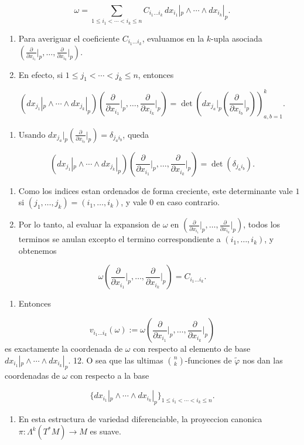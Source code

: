 \begin{bookproof}{}
\[
\omega=\sum_{1\le i_1<\cdots<i_k\le n}C_{i_1\ldots i_k}\,dx_{i_1}|_p\wedge\cdots\wedge dx_{i_k}|_p.
\]
\begin{enumerate}[start=6]
\item Para averiguar el coeficiente $C_{i_1\ldots i_k}$, evaluamos en la $k$-upla asociada $\left(\frac{\partial}{\partial x_{i_1}}\big|_p,\ldots,\frac{\partial}{\partial x_{i_k}}\big|_p\right)$.
\item En efecto, si $1\le j_1<\cdots<j_k\le n$, entonces
\end{enumerate}
\[
(dx_{j_1}|_p\wedge\cdots\wedge dx_{j_k}|_p)\left(\frac{\partial}{\partial x_{i_1}}\bigg|_p,\ldots,\frac{\partial}{\partial x_{i_k}}\bigg|_p\right)=\det\left(dx_{j_a}|_p\left(\frac{\partial}{\partial x_{i_b}}\bigg|_p\right)\right)_{a,b=1}^k.
\]
\begin{enumerate}[start=8]
\item Usando $dx_{j_a}|_p\left(\frac{\partial}{\partial x_{i_b}}\big|_p\right)=\delta_{j_a i_b}$, queda
\end{enumerate}
\[
(dx_{j_1}|_p\wedge\cdots\wedge dx_{j_k}|_p)\left(\frac{\partial}{\partial x_{i_1}}\bigg|_p,\ldots,\frac{\partial}{\partial x_{i_k}}\bigg|_p\right)=\det(\delta_{j_a i_b}).
\]
\begin{enumerate}[start=9]
\item Como los indices estan ordenados de forma creciente, este determinante vale $1$ si $(j_1,\ldots,j_k)=(i_1,\ldots,i_k)$, y vale $0$ en caso contrario.
\item Por lo tanto, al evaluar la expansion de $\omega$ en $\left(\frac{\partial}{\partial x_{i_1}}\big|_p,\ldots,\frac{\partial}{\partial x_{i_k}}\big|_p\right)$, todos los terminos se anulan excepto el termino correspondiente a $(i_1,\ldots,i_k)$, y obtenemos
\end{enumerate}
\[
\omega\left(\frac{\partial}{\partial x_{i_1}}\bigg|_p,\ldots,\frac{\partial}{\partial x_{i_k}}\bigg|_p\right)=C_{i_1\ldots i_k}.
\]
\begin{enumerate}[start=11]
\item Entonces
\end{enumerate}
\[
v_{i_1\ldots i_k}(\omega):=\omega\left(\frac{\partial}{\partial x_{i_1}}\bigg|_p,\ldots,\frac{\partial}{\partial x_{i_k}}\bigg|_p\right)
\]
es exactamente la coordenada de $\omega$ con respecto al elemento de base $dx_{i_1}|_p\wedge\cdots\wedge dx_{i_k}|_p$. 12. O sea que las ultimas $\binom nk$-funciones de $\widetilde\varphi$ nos dan las coordenadas de $\omega$ con respecto a la base

\[
\{dx_{i_1}|_p\wedge\cdots\wedge dx_{i_k}|_p\}_{1\le i_1<\cdots<i_k\le n}.
\]
\begin{enumerate}[start=13]
\item En esta estructura de variedad diferenciable, la proyeccion canonica $\pi:\Lambda^k(T^*M)\to M$ es suave.
\end{enumerate}
\bookqed
\end{bookproof}

